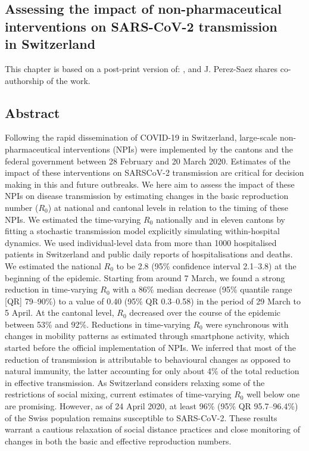 \begin{fullwidth}
\chapter[Assessing the impact of non-pharmaceutical interventions on SARS-CoV-2 transmission in Switzerland]{Assessing the impact of non-pharmaceutical\\ interventions on SARS-CoV-2 transmission\\ in Switzerland}
\label{ch:covid-switzerland-npi}
This chapter is based on a post-print version of:
, and J. Perez-Saez shares co-authorship of the work.
\section{Abstract}
Following the rapid dissemination of COVID-19 in Switzerland, large-scale non-pharmaceutical interventions (NPIs) were implemented by the cantons and the federal government between 28 February and 20 March 2020. Estimates of the impact of these interventions on SARSCoV-2 transmission are critical for decision making in this and future outbreaks. We here aim to assess the impact of these NPIs on disease transmission by estimating changes in the basic reproduction number ($R_0$) at national and cantonal levels in relation to the timing of these NPIs. We estimated the time-varying $R_0$ nationally and in eleven cantons by fitting a stochastic transmission model explicitly simulating within-hospital dynamics. We used individual-level data from more than 1000 hospitalised patients in Switzerland and public daily reports of hospitalisations and deaths. We estimated the national $R_0$ to be 2.8 (95\% confidence interval 2.1–3.8) at the beginning of the epidemic. Starting from around 7 March, we found a strong reduction in time-varying $R_0$ with a 86\% median decrease (95\% quantile range [QR] 79–90\%) to a value of 0.40 (95\% QR 0.3–0.58) in the period of 29 March to 5 April. At the cantonal level, $R_0$ decreased over the course of the epidemic between 53\% and 92\%. Reductions in time-varying $R_0$ were synchronous with changes in mobility patterns as estimated through smartphone activity, which started before the official implementation of NPIs. We inferred that most of the reduction of transmission is attributable to behavioural changes as opposed to natural immunity, the latter accounting for only about 4\% of the total reduction in effective transmission. As Switzerland considers relaxing some of the restrictions of social mixing, current estimates of time-varying $R_0$ well below one are promising. However, as of 24 April 2020, at least 96\% (95\% QR 95.7–96.4\%) of the Swiss population remains susceptible to SARS-CoV-2. These results warrant a cautious relaxation of social distance practices and close monitoring of changes in both the basic and effective reproduction numbers.
\end{fullwidth}

